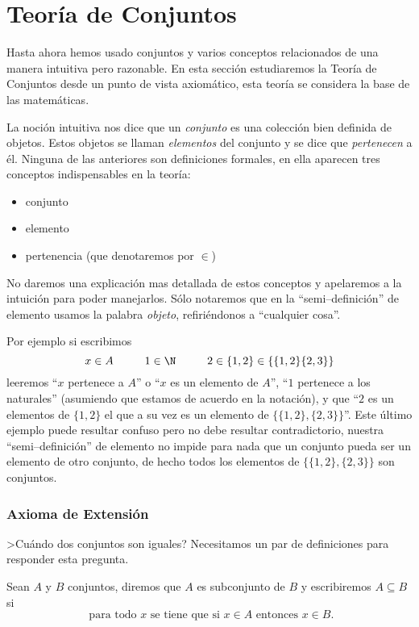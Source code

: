 \section{Teoría de Conjuntos}
Hasta ahora hemos usado conjuntos y varios conceptos relacionados de una manera intuitiva pero razonable.
En esta sección estudiaremos la Teoría de Conjuntos desde un punto de vista axiomático, esta teoría se considera la base de las matemáticas.

La noción intuitiva nos dice que un \emph{conjunto} es una colección bien definida de objetos.
Estos objetos se llaman \emph{elementos} del conjunto y se dice que \emph{pertenecen} a él.
Ninguna de las anteriores son definiciones formales, en ella aparecen tres conceptos indispensables en la teoría:
\begin{itemize}
\itemsep 0pt
\item conjunto
\item elemento
\item pertenencia (que denotaremos por $\in$)
\end{itemize}
No daremos una explicación mas detallada de estos conceptos y apelaremos a la intuición para poder manejarlos.
Sólo notaremos que en la ``semi--definición'' de elemento usamos la palabra \emph{objeto}, refiriéndonos a ``cualquier cosa''.

Por ejemplo si escribimos
\[
x\in A\;\;\;\;\;\;\;\;\;\;1\in\N\;\;\;\;\;\;\;\;\;\;2\in\{1,2\}\in\{\{1,2\}\{2,3\}\}
\]
leeremos ``$x$ pertenece a $A$'' o ``$x$ es un elemento de $A$'', ``$1$ pertenece a los naturales'' (asumiendo que estamos de acuerdo en la notación), y que ``$2$ es un elementos de $\{1,2\}$ el que a su vez es un elemento de $\{\{1,2\},\{2,3\}\}$''.
Este último ejemplo puede resultar confuso pero no debe resultar contradictorio, nuestra ``semi--definición'' de elemento no impide para nada que un conjunto pueda ser un elemento de otro conjunto, de hecho todos los elementos de $\{\{1,2\},\{2,3\}\}$ son conjuntos.

\subsubsection*{Axioma de Extensión}
>Cuándo dos conjuntos son iguales?
Necesitamos un par de definiciones para responder esta pregunta.

\begin{definicion}
Sean $A$ y $B$ conjuntos, diremos que $A$ es subconjunto de $B$ y escribiremos $A\subseteq B$ si
\[
\text{ para todo } x \text{ se tiene que si }x\in A\text{ entonces }x\in B.
\]
\end{definicion}

